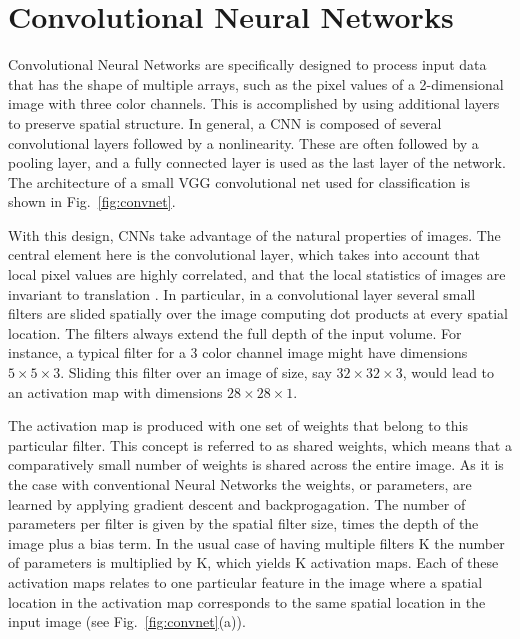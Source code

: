 \section{Convolutional Neural Networks}
Convolutional Neural Networks \parencite{vaillant1993, lecun1998} are specifically designed to process input data that has the shape of multiple arrays, such as the pixel values of a 2-dimensional image with three color channels. This is accomplished by using additional layers to preserve spatial structure. In general, a CNN is composed of several convolutional layers followed by a nonlinearity. These are often followed by a pooling layer, and a fully connected layer is used as the last layer of the network. The architecture of a small VGG convolutional net \parencite{simonyan2014}  used for classification is shown in Fig.~\ref{fig:convnet}.

With this design, CNNs take advantage of the natural properties of images. The central element here is the convolutional layer, which takes into account that local pixel values are highly correlated, and that the local statistics of images are invariant to translation \parencite{lawrence1997}. In particular, in a convolutional layer several small filters are slided spatially over the image computing dot products at every spatial location. The filters always extend the full depth of the input volume. For instance, a typical filter for a 3 color channel image might have dimensions $5 \times 5 \times 3$. Sliding this filter over an image of size, say  $32\times32\times3$, would lead to an activation map with dimensions $28\times28\times1$. 

The activation map is produced with one set of weights that belong to this particular filter. This concept is referred to as shared weights, which means that a comparatively small number of weights is shared across the entire image. As it is the case with conventional Neural Networks the weights, or parameters, are learned by applying gradient descent and backprogagation.  The number of parameters per filter is given by the spatial filter size, times the depth of the image plus a bias term. In the usual case of having multiple filters K the number of parameters is multiplied by K, which yields K activation maps. Each of these activation maps relates to one particular feature in the image where a spatial location in the activation map corresponds to the same spatial location in the input image (see Fig.~\ref{fig:convnet}(a)). 


